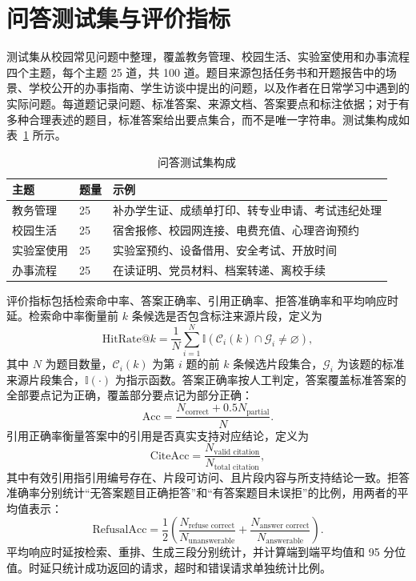 \section{问答测试集与评价指标}
\label{sec:metrics}

测试集从校园常见问题中整理，覆盖教务管理、校园生活、实验室使用和办事流程四个主题，每个主题 25 道，共 100 道。题目来源包括任务书和开题报告中的场景、学校公开的办事指南、学生访谈中提出的问题，以及作者在日常学习中遇到的实际问题。每道题记录问题、标准答案、来源文档、答案要点和标注依据；对于有多种合理表述的题目，标准答案给出要点集合，而不是唯一字符串。测试集构成如表~\ref{tab:testset} 所示。

\begin{table}[H]
  \centering
  \caption{问答测试集构成}
  \label{tab:testset}
  \renewcommand{\arraystretch}{1.25}
  \begin{tabular}{p{2.6cm}p{1.4cm}p{8.4cm}}
    \toprule
    主题 & 题量 & 示例 \\
    \midrule
    教务管理 & 25 & 补办学生证、成绩单打印、转专业申请、考试违纪处理 \\
    校园生活 & 25 & 宿舍报修、校园网连接、电费充值、心理咨询预约 \\
    实验室使用 & 25 & 实验室预约、设备借用、安全考试、开放时间 \\
    办事流程 & 25 & 在读证明、党员材料、档案转递、离校手续 \\
    \bottomrule
  \end{tabular}
\end{table}

评价指标包括检索命中率、答案正确率、引用正确率、拒答准确率和平均响应时延。检索命中率衡量前 $k$ 条候选是否包含标注来源片段，定义为
\begin{equation}
  \mathrm{HitRate@}k=\frac{1}{N}\sum_{i=1}^{N}\mathbb{I}\left(\mathcal{C}_i(k)\cap\mathcal{G}_i\neq\varnothing\right),
  \label{eq:hitrate}
\end{equation}
其中 $N$ 为题目数量，$\mathcal{C}_i(k)$ 为第 $i$ 题的前 $k$ 条候选片段集合，$\mathcal{G}_i$ 为该题的标准来源片段集合，$\mathbb{I}(\cdot)$ 为指示函数。答案正确率按人工判定，答案覆盖标准答案的全部要点记为正确，覆盖部分要点记为部分正确：
\begin{equation}
  \mathrm{Acc}=\frac{N_{\text{correct}}+0.5N_{\text{partial}}}{N}.
  \label{eq:accuracy}
\end{equation}
引用正确率衡量答案中的引用是否真实支持对应结论，定义为
\begin{equation}
  \mathrm{CiteAcc}=\frac{N_{\text{valid citation}}}{N_{\text{total citation}}},
  \label{eq:citeacc}
\end{equation}
其中有效引用指引用编号存在、片段可访问、且片段内容与所支持结论一致。拒答准确率分别统计“无答案题目正确拒答”和“有答案题目未误拒”的比例，用两者的平均值表示：
\begin{equation}
  \mathrm{RefusalAcc}=\frac{1}{2}\left(\frac{N_{\text{refuse correct}}}{N_{\text{unanswerable}}}+
  \frac{N_{\text{answer correct}}}{N_{\text{answerable}}}\right).
  \label{eq:refusal}
\end{equation}
平均响应时延按检索、重排、生成三段分别统计，并计算端到端平均值和 95 分位值。时延只统计成功返回的请求，超时和错误请求单独统计比例。

